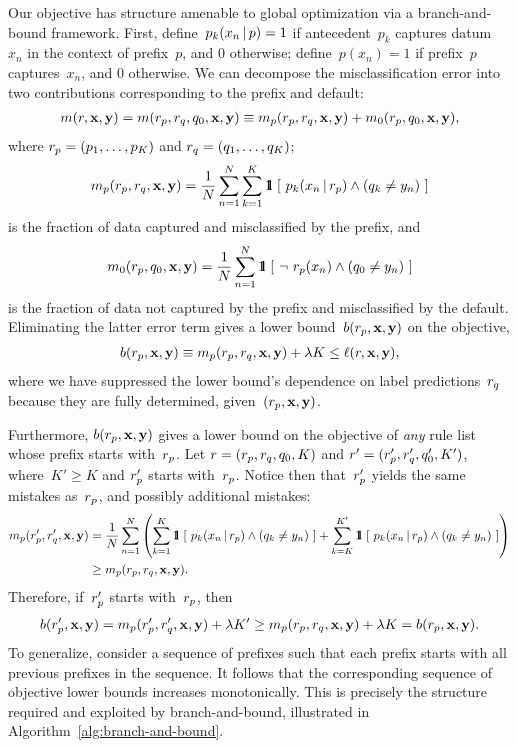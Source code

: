Our objective has structure amenable to global optimization via a branch-and-bound framework.
%
First, define~${p_k(x_n \,|\, p) = 1}$ if antecedent~$p_k$ captures datum~$x_n$
in the context of prefix~$p$, and 0 otherwise;
define~${p(x_n) = 1}$ if prefix~$p$ captures~$x_n$, and 0 otherwise.
%
We can decompose the misclassification error into two contributions
corresponding to the prefix and default:
\begin{align}
m(\RL, \x, \y) = m(\Prefix, r_q, q_0, \x, \y) \equiv m_p(\Prefix, \RL_q, \x, \y) + m_0(\Prefix, q_0, \x, \y),
\end{align}
where ${{r_p} = (p_1, \dots, p_K)}$ and ${{r}_q = (q_1, \dots, q_K)}$;
\begin{align}
m_p(\Prefix, \RL_q, \x, \y) =
\frac{1}{N} \sum_{n=1}^N \sum_{k=1}^K \eins ~[~ p_k(x_n \given \Prefix) \wedge (q_k \neq y_n) ~]
\end{align}
is the fraction of data captured and misclassified by the prefix, and
\begin{align}
m_0(\Prefix, q_0, \x, \y) =
\frac{1}{N} \sum_{n=1}^N \eins ~[~ \neg~ \Prefix(x_n) \wedge (q_0 \neq y_n) ~]
\end{align}
is the fraction of data not captured by the prefix and misclassified by the default.
%
Eliminating the latter error term gives a lower bound~$b({r_p}, \mathbf{x}, \mathbf{y})$ on the objective,
\begin{align}
b(\Prefix, \x, \y) \equiv m_p(\Prefix, \RL_q, \x, \y) + \Reg K \le \ell(\RL, \x, \y),
\label{eq:lower-bound}
\end{align}
where we have suppressed the lower bound's dependence on label predictions~${r}_q$
because they are fully determined, given~${({r_p}, \mathbf{x}, \mathbf{y})}$.

Furthermore, $b({r_p}, \mathbf{x}, \mathbf{y})$ gives a lower bound on the objective of
\emph{any} rule list whose prefix starts with~${r_p}$.
%
Let ${{r} = ({r_p}, {r}_q, q_0, K)}$ and ${{r}' = ({r'_p}, {r}'_q, q'_0, K')}$,
where~${K' \ge K}$ and ${r'_p}$ starts with~${r_p}$.
%
Notice then that~${r'_p}$ yields the same mistakes as~${r_p}$,
and possibly additional mistakes:
\begin{align}
m_p(\PrefixP, \RL'_q, \x, \y) &=
\frac{1}{N} \sum_{n=1}^N \left( \sum_{k=1}^K \eins ~[~ p_k(x_n \given \Prefix) \wedge (q_k \neq y_n) ~]
+ \sum_{k=K}^{K'} \eins ~[~ p_k(x_n \given \Prefix) \wedge (q_k \neq y_n) ~] \right) \nn \\
&\ge m_p(\Prefix, \RL_q, \x, \y).
\end{align}
Therefore, if~${r'_p}$ starts with~${r_p}$, then
\begin{align}
b(\PrefixP, \x, \y) = m_p(\PrefixP, \RL'_q, \x, \y) + \lambda K'
\ge m_p(\Prefix, \RL_q, \x, \y) + \lambda K
= b(\Prefix, \x, \y).
\label{eq:prefix-lb}
\end{align}
%
To generalize, consider a sequence of prefixes such that each prefix
starts with all previous prefixes in the sequence.
%
It follows that the corresponding sequence of objective lower bounds
increases monotonically.
%
This is precisely the structure required and exploited by branch-and-bound,
illustrated in Algorithm~\ref{alg:branch-and-bound}.

